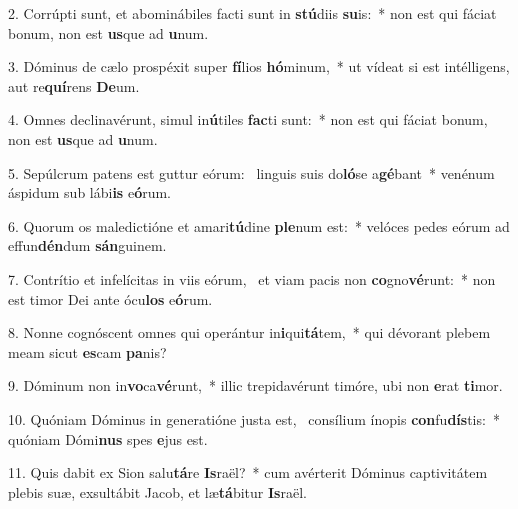 2. Corrúpti sunt, et abominábiles facti sunt in \textbf{stú}diis \textbf{su}is:~*  non est qui fáciat bonum, non est \textbf{us}que ad \textbf{u}num.\

3. Dóminus de cælo prospéxit super \textbf{fí}lios \textbf{hó}minum,~*  ut vídeat si est intélligens, aut re\textbf{quí}rens \textbf{De}um.\

4. Omnes declinavérunt, simul in\textbf{ú}tiles \textbf{fac}ti sunt:~*  non est qui fáciat bonum, non est \textbf{us}que ad \textbf{u}num.\

5. Sepúlcrum patens est guttur eórum: \dag\  linguis suis do\textbf{ló}se a\textbf{gé}bant~*  venénum áspidum sub lábi\textbf{is} e\textbf{ó}rum.\

6. Quorum os maledictióne et amari\textbf{tú}dine \textbf{ple}num est:~*  velóces pedes eórum ad effun\textbf{dén}dum \textbf{sán}guinem.\

7. Contrítio et infelícitas in viis eórum, \dag\  et viam pacis non \textbf{co}gno\textbf{vé}runt:~*  non est timor Dei ante ócu\textbf{los} e\textbf{ó}rum.\

8. Nonne cognóscent omnes qui operántur in\textbf{i}qui\textbf{tá}tem,~*  qui dévorant plebem meam sicut \textbf{es}cam \textbf{pa}nis?\

9. Dóminum non in\textbf{vo}ca\textbf{vé}runt,~*  illic trepidavérunt timóre, ubi non \textbf{e}rat \textbf{ti}mor.\

10. Quóniam Dóminus in generatióne justa est, \dag\  consílium ínopis \textbf{con}fu\textbf{dís}tis:~*  quóniam Dómi\textbf{nus} spes \textbf{e}jus est.\

11. Quis dabit ex Sion salu\textbf{tá}re \textbf{Is}raël?~*  cum avérterit Dóminus captivitátem plebis suæ, exsultábit Jacob, et læ\textbf{tá}bitur \textbf{Is}raël.\

